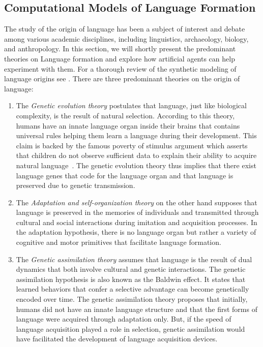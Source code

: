 \subsection{Computational Models of Language Formation}
\label{sec:self-orga-lan-context}
The study of the origin of language has been a subject of interest and debate among various academic disciplines, including linguistics, archaeology, biology, and anthropology. In this section, we will shortly present the predominant theories on Language formation and explore how artificial agents can help experiment with them. For a thorough review of the synthetic modeling of language origins see \citet{steels1997evolution}. There are three predominant theories on the origin of language:
\begin{enumerate}[noitemsep]
\item The \textit{Genetic evolution theory} postulates that language, just like biological complexity,  is the result of natural selection. According to this theory, humans have an innate language organ inside their brains that contains universal rules helping them learn a language during their development. This claim is backed by the famous poverty of stimulus argument which asserts that children do not observe sufficient data to explain their ability to acquire natural language~\citep{chomsky1975reflections}. The genetic evolution theory thus implies that there exist language genes that code for the language organ and that language is preserved due to genetic transmission. 
\item The \textit{Adaptation and self-organization theory} on the other hand supposes that language is preserved in the memories of individuals and transmitted through cultural and social interactions during imitation and acquisition processes. In the adaptation hypothesis, there is no language organ but rather a variety of cognitive and motor primitives that facilitate language formation. 
\item The \textit{Genetic assimilation theory} assumes that language is the result of dual dynamics that both involve cultural and genetic interactions. The genetic assimilation hypothesis is also known as the Baldwin effect. It states that learned behaviors that confer a selective advantage can become genetically encoded over time.  The genetic assimilation theory proposes that initially, humans did not have an innate language structure and that the first forms of language were acquired through adaptation only. But, if the speed of language acquisition played a role in selection, genetic assimilation would have facilitated the development of language acquisition devices.
\end{enumerate}

